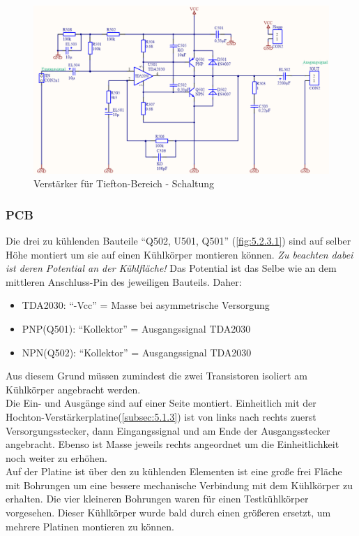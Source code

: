 \begin{figure} [H]
	\centering	
	\includegraphics[width=1\textwidth]{img/Print5/5_TTVerstaerker-Schem.PNG}
	\caption{Verstärker für Tiefton-Bereich - Schaltung}
	\label {fig:5.2.2.1}
\end{figure}

\newpage
\subsubsection{PCB}\label{subsec:5.2.3}
Die drei zu kühlenden Bauteile \enquote{Q502, U501, Q501} (\ref{fig:5.2.3.1}) sind auf selber Höhe montiert um sie auf einen Kühlkörper montieren können.
\emph{Zu beachten dabei ist deren Potential an der Kühlfläche!}
Das Potential ist das Selbe wie an dem mittleren Anschluss-Pin des jeweiligen Bauteils.
Daher:
\begin{itemize}
	\item TDA2030: \enquote{-Vcc} = Masse bei asymmetrische Versorgung
	\item PNP(Q501): \enquote{Kollektor} = Ausgangssignal TDA2030
	\item NPN(Q502): \enquote{Kollektor} = Ausgangssignal TDA2030
\end{itemize}

Aus diesem Grund müssen zumindest die zwei Transistoren isoliert am Kühlkörper angebracht werden.\\
Die Ein- und Ausgänge sind auf einer Seite montiert. 
Einheitlich mit der Hochton-Verstärkerplatine(\ref{subsec:5.1.3}) ist von links nach rechts zuerst Versorgungsstecker, dann Eingangssignal und am Ende der Ausgangsstecker angebracht.
Ebenso ist Masse jeweils rechts angeordnet um die Einheitlichkeit noch weiter zu erhöhen.\\
Auf der Platine ist über den zu kühlenden Elementen ist eine große frei Fläche mit Bohrungen um eine bessere mechanische Verbindung mit dem Kühlkörper zu erhalten.
Die vier kleineren Bohrungen waren für einen Testkühlkörper vorgesehen. 
Dieser Kühlkörper wurde bald durch einen größeren ersetzt, um mehrere Platinen montieren zu können.

